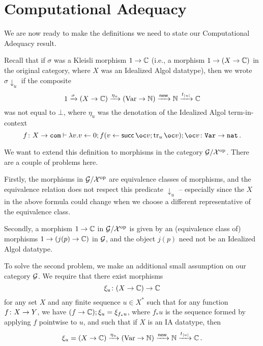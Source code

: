 \section{Computational Adequacy}

We are now ready to make the definitions we need to state our Computational Adequacy result.

Recall that if $\sigma$ was a Kleisli morphism $1 \to \mathbb{C}$ (i.e., a morphism $1 \to (X \to \mathbb{C})$ in the original category, where $X$ was an Idealized Algol datatype), then we wrote $\sigma\downarrow_u$ if the composite
\[
  1 \xrightarrow{\sigma} (X \to \mathbb{C}) \xrightarrow{\eta_u} (\operatorname{Var} \to \mathbb{N}) \xrightarrow{\operatorname{{\mathsf{new}}}} \mathbb{N} \xrightarrow{t_{|u|}} \mathbb{C}
  \]
was not equal to $\bot$, where $\eta_u$ was the denotation of the Idealized Algol term-in-context
\[
  f \from X \to \com \ts \lambda v.v\gets 0;f(v\gets\suc\oc v;\tr_u \oc v);\oc v \from \Var \to \nat\,.
  \]

We want to extend this definition to morphisms in the category $\mathcal G/\mathcal X^{\mathrm{op}}$.  
There are a couple of problems here.  

Firstly, the morphisms in $\mathcal G/\mathcal X^{\mathrm{op}}$ are equivalence classes of \Mellies morphisms, and the equivalence relation does not respect this predicate $\downarrow_u$ -- especially since the $X$ in the above formula could change when we choose a different representative of the equivalence class.

Secondly, a morphism $1 \to \mathbb{C}$ in $\mathcal G/\mathcal X^{\mathrm{op}}$ is given by an (equivalence class of) morphisms $1 \to (j(p) \to \mathbb{C})$ in $\mathcal G$, and the object $j(p)$ need not be an Idealized Algol datatype.

To solve the second problem, we make an additional small assumption on our category $\mathcal G$.  
We require that there exist morphisms
\[
  \xi_u \colon (X \to \mathbb{C}) \to \mathbb{C}
  \]
for any set $X$ and any finite sequence $u\in X^*$ such that for any function $f \colon X \to Y$, we have $(f\to \mathbb{C});\xi_u = \xi_{f_*u}$, where $f_*u$ is the sequence formed by applying $f$ pointwise to $u$, and such that if $X$ is an IA datatype, then
\[
  \xi_u = (X \to \mathbb{C}) \xrightarrow{\eta_u} (\operatorname{Var} \to \mathbb{N}) \xrightarrow{\operatorname{{\mathsf{new}}}} \mathbb{N} \xrightarrow{t_{|u|}} \mathbb{C}\,.
  \]

